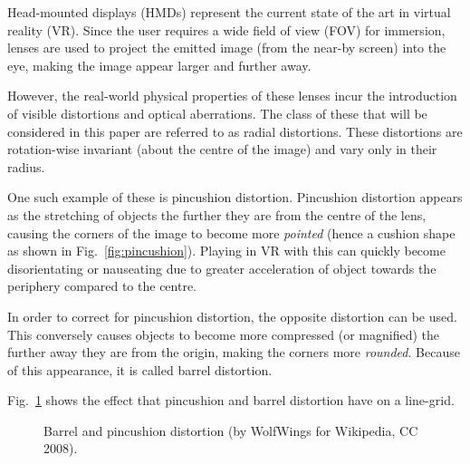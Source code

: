Head-mounted displays (HMDs) represent the current state of the art in virtual reality (VR).
Since the user requires a wide field of view (FOV) for immersion, lenses are used to project the emitted image (from the near-by screen) into the eye, making the image appear larger and further away.

However, the real-world physical properties of these lenses incur the introduction of visible distortions and optical aberrations.
The class of these that will be considered in this paper are referred to as radial distortions.
These distortions are rotation-wise invariant (about the centre of the image) and vary only in their radius.

One such example of these is pincushion distortion.
Pincushion distortion appears as the stretching of objects the further they are from the centre of the lens, causing the corners of the image to become more \textit{pointed} (hence a cushion shape as shown in Fig.~\ref{fig:pincushion}).
Playing in VR with this can quickly become disorientating or nauseating due to greater acceleration of object towards the periphery compared to the centre.

In order to correct for pincushion distortion, the opposite distortion can be used.
This conversely causes objects to become more compressed (or magnified) the further away they are from the origin, making the corners more \textit{rounded}.
Because of this appearance, it is called barrel distortion.

Fig.~\ref{fig:distortion} shows the effect that pincushion and barrel distortion have on a line-grid.

\begin{figure}[ht]
    \centering
    \hfil
    \caption{Barrel and pincushion distortion (by WolfWings for Wikipedia, CC 2008).}
    \label{fig:distortion}
\end{figure}

